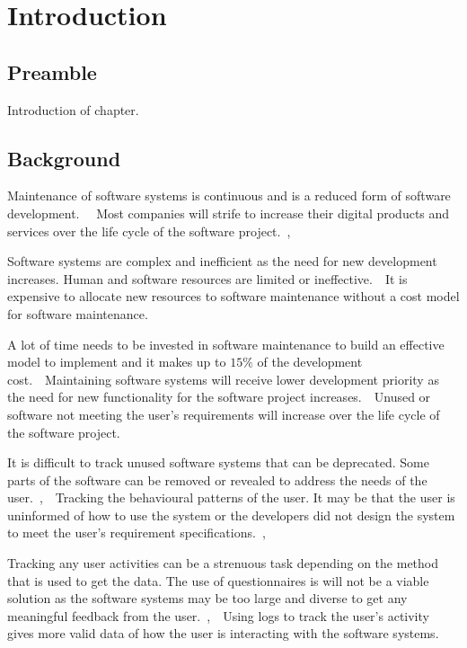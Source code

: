 \chapter{Introduction}
\label{chap:1}

\section{Preamble}
Introduction of chapter.

\section{Background}

Maintenance of software systems is continuous and is a reduced form of software
development.~\cite{Sneed2004}~ Most companies will strife to increase their
digital products and services over the life cycle of the software
project.~\cite{Niu2018},~\cite{Galster2019}\par Software systems are complex and
inefficient as the need for new development increases. Human and software
resources are limited or ineffective.~\cite{Pecchia2015}~It is expensive to
allocate new resources to software maintenance without a cost model for software
maintenance.~\cite{Galster2019}\par A lot of time needs to be invested in
software maintenance to build an effective model to implement and it makes up to
$15\%$ of the development cost.~\cite{Lenarduzzi2017}~Maintaining software
systems will receive lower development priority as the need for new
functionality for the software project increases.~\cite{Sneed2004}~Unused or
software not meeting the user's requirements will increase over the life cycle
of the software project.~\cite{Thankachan2018}\par It is difficult to track
unused software systems that can be deprecated. Some parts of the software can
be removed or revealed to address the needs of the
user.~\cite{Dalpiaz2018},~\cite{Shahid2016}~Tracking the behavioural patterns of
the user. It may be that the user is uninformed of how to use the system or the
developers did not design the system to meet the user's requirement
specifications.~\cite{Slaninova2014},~\cite{Chen2019}\par Tracking any user
activities can be a strenuous task depending on the method that is used to get the
data. The use of questionnaires is will not be a viable solution as the software
systems may be too large and diverse to get any meaningful feedback from the
user.~\cite{Slaninova2014},~\cite{Waqar2017}~Using logs to track the user's
activity gives more valid data of how the user is interacting with the software
systems.~\cite{Lei2018}

